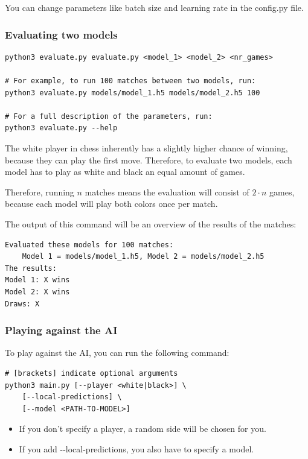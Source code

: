 \documentclass{article}
\begin{document}
You can change parameters like batch size and learning rate in the config.py file. 

\subsubsection{Evaluating two models}

\begin{verbatim}
python3 evaluate.py evaluate.py <model_1> <model_2> <nr_games>

# For example, to run 100 matches between two models, run:
python3 evaluate.py models/model_1.h5 models/model_2.h5 100

# For a full description of the parameters, run:
python3 evaluate.py --help
\end{verbatim}

The white player in chess inherently has a slightly higher chance of winning,
because they can play the first move. Therefore, to evaluate two models, 
each model has to play as white and black an equal amount of games.

Therefore, running $n$ matches means the evaluation will consist of $2\cdot n$ games, because
each model will play both colors once per match.

The output of this command will be an overview of the results of the matches:

\begin{verbatim}
Evaluated these models for 100 matches: 
    Model 1 = models/model_1.h5, Model 2 = models/model_2.h5 
The results: 
Model 1: X wins
Model 2: X wins
Draws: X
\end{verbatim}

\subsubsection{Playing against the AI}

To play against the AI, you can run the following command:

\begin{verbatim}
# [brackets] indicate optional arguments
python3 main.py [--player <white|black>] \
    [--local-predictions] \
    [--model <PATH-TO-MODEL>]
\end{verbatim}


\begin{itemize}
    \item If you don't specify a player, a random side will be chosen for you.
    \item If you add -{}-local-predictions, you also have to specify a model.
\end{itemize}
\end{document}
